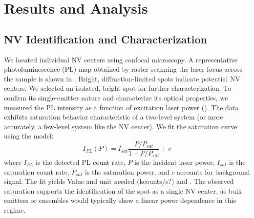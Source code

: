 \documentclass[aps,prb,twocolumn,superscriptaddress,floatfix,longbibliography,citeautoscript]{revtex4-2}
\begin{document}

\section{\label{sec:results}Results and Analysis}

\subsection{\label{sec:results_id}NV Identification and Characterization}
We located individual NV centers using confocal microscopy.
A representative photoluminescence (PL) map obtained by raster scanning the \blue{$532 \si{\nano\meter}$} laser focus across the sample is shown in .
Bright, diffraction-limited spots indicate potential NV centers.
We selected an isolated, bright spot for further characterization.
To confirm its single-emitter nature and characterize its optical properties, we measured the PL intensity as a function of excitation laser power ().
The data exhibits saturation behavior characteristic of a two-level system (or more accurately, a few-level system like the NV center).
We fit the saturation curve using the model:
\begin{equation}
    I_{PL}(P) = I_{sat} \frac{P/P_{sat}}{1+P/P_{sat}} + c
    \label{eq:saturation}
\end{equation}
where $I_{PL}$ is the detected PL count rate, $P$ is the incident laser power, $I_{sat}$ is the saturation count rate, $P_{sat}$ is the saturation power, and $c$ accounts for background signal.
The fit yields  Value and unit needed (kcounts/s?) and .
The observed saturation supports the identification of the spot as a single NV center, as bulk emitters or ensembles would typically show a linear power dependence in this regime.
\end{document}
